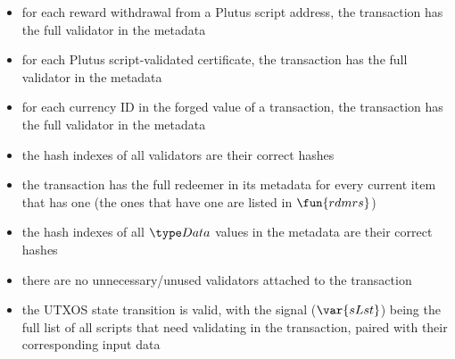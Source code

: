 \begin{itemize}
  \item for each reward withdrawal from a Plutus script address, the transaction
  has the full validator in the metadata

  \item for each Plutus script-validated certificate, the transaction
  has the full validator in the metadata

  \item for each currency ID in the forged value of a transaction, the transaction
  has the full validator in the metadata

  \item the hash indexes of all validators are their correct hashes

  \item the transaction has the full redeemer in its metadata for every current
  item that has one (the ones that have one are listed in $\fun{rdmrs}$)

  \item the hash indexes of all $\Data$ values in the metadata are their correct hashes

  \item there are no unnecessary/unused validators attached to the transaction

  \item the UTXOS state transition is valid, with the signal ($\var{sLst}$) being
  the full list of all scripts that need validating in the transaction, paired with
  their corresponding input data
\end{itemize}


